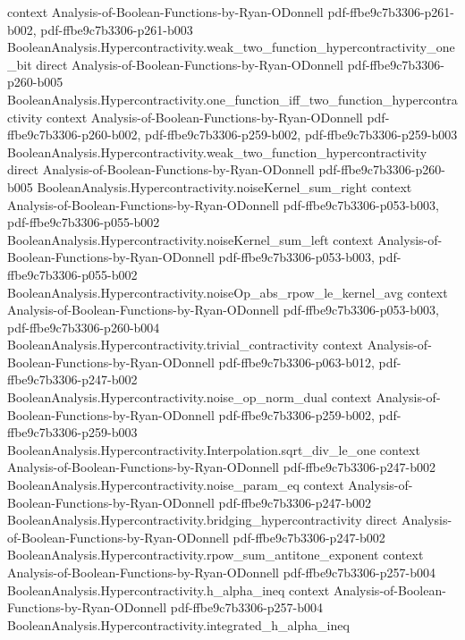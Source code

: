 \begin{theorem}
  {context}
  {Analysis-of-Boolean-Functions-by-Ryan-ODonnell}
  {pdf-ffbe9c7b3306-p261-b002,
    pdf-ffbe9c7b3306-p261-b003}
\proofstep
  {BooleanAnalysis.Hypercontractivity.weak_two_function_hypercontractivity_one_bit}
  {direct}
  {Analysis-of-Boolean-Functions-by-Ryan-ODonnell}
  {pdf-ffbe9c7b3306-p260-b005}
\proofstep
  {BooleanAnalysis.Hypercontractivity.one_function_iff_two_function_hypercontractivity}
  {context}
  {Analysis-of-Boolean-Functions-by-Ryan-ODonnell}
  {pdf-ffbe9c7b3306-p260-b002,
    pdf-ffbe9c7b3306-p259-b002,
    pdf-ffbe9c7b3306-p259-b003}
\proofstep
  {BooleanAnalysis.Hypercontractivity.weak_two_function_hypercontractivity}
  {direct}
  {Analysis-of-Boolean-Functions-by-Ryan-ODonnell}
  {pdf-ffbe9c7b3306-p260-b005}
\proofstep
  {BooleanAnalysis.Hypercontractivity.noiseKernel_sum_right}
  {context}
  {Analysis-of-Boolean-Functions-by-Ryan-ODonnell}
  {pdf-ffbe9c7b3306-p053-b003,
    pdf-ffbe9c7b3306-p055-b002}
\proofstep
  {BooleanAnalysis.Hypercontractivity.noiseKernel_sum_left}
  {context}
  {Analysis-of-Boolean-Functions-by-Ryan-ODonnell}
  {pdf-ffbe9c7b3306-p053-b003,
    pdf-ffbe9c7b3306-p055-b002}
\proofstep
  {BooleanAnalysis.Hypercontractivity.noiseOp_abs_rpow_le_kernel_avg}
  {context}
  {Analysis-of-Boolean-Functions-by-Ryan-ODonnell}
  {pdf-ffbe9c7b3306-p053-b003,
    pdf-ffbe9c7b3306-p260-b004}
\proofstep
  {BooleanAnalysis.Hypercontractivity.trivial_contractivity}
  {context}
  {Analysis-of-Boolean-Functions-by-Ryan-ODonnell}
  {pdf-ffbe9c7b3306-p063-b012,
    pdf-ffbe9c7b3306-p247-b002}
\proofstep
  {BooleanAnalysis.Hypercontractivity.noise_op_norm_dual}
  {context}
  {Analysis-of-Boolean-Functions-by-Ryan-ODonnell}
  {pdf-ffbe9c7b3306-p259-b002,
    pdf-ffbe9c7b3306-p259-b003}
\proofstep
  {BooleanAnalysis.Hypercontractivity.Interpolation.sqrt_div_le_one}
  {context}
  {Analysis-of-Boolean-Functions-by-Ryan-ODonnell}
  {pdf-ffbe9c7b3306-p247-b002}
\proofstep
  {BooleanAnalysis.Hypercontractivity.noise_param_eq}
  {context}
  {Analysis-of-Boolean-Functions-by-Ryan-ODonnell}
  {pdf-ffbe9c7b3306-p247-b002}
\proofstep
  {BooleanAnalysis.Hypercontractivity.bridging_hypercontractivity}
  {direct}
  {Analysis-of-Boolean-Functions-by-Ryan-ODonnell}
  {pdf-ffbe9c7b3306-p247-b002}
\proofstep
  {BooleanAnalysis.Hypercontractivity.rpow_sum_antitone_exponent}
  {context}
  {Analysis-of-Boolean-Functions-by-Ryan-ODonnell}
  {pdf-ffbe9c7b3306-p257-b004}
\proofstep
  {BooleanAnalysis.Hypercontractivity.h_alpha_ineq}
  {context}
  {Analysis-of-Boolean-Functions-by-Ryan-ODonnell}
  {pdf-ffbe9c7b3306-p257-b004}
\proofstep
  {BooleanAnalysis.Hypercontractivity.integrated_h_alpha_ineq}

\end{theorem}
